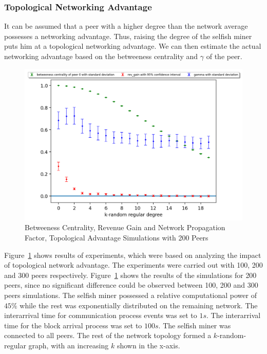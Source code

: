 \subsubsection{Topological Networking Advantage}
It can be assumed that a peer with a higher degree than the network average possesses a networking advantage. Thus, raising the degree of the selfish miner puts him at a topological networking advantage. We can then estimate the actual networking advantage based on the betweeness centrality and $\gamma$ of the peer. 
\begin{figure}[h]
		\includegraphics[width=\textwidth]{figures/full_sm_multi_degree_200rev_and_bpr_per_peer.png}
		
\caption{Betweeness Centrality, Revenue Gain and Network Propagation Factor, Topological Advantage Simulations with 200 Peers}
\label{fig:top_adv200}
\end{figure}

Figure~\ref{fig:top_adv200} shows results of experiments, which were based on analyzing the impact of topological network advantage. The experiments were carried out with 100, 200 and 300 peers respectively. Figure~\ref{fig:top_adv200} shows the results of the simulations for 200 peers, since no significant difference could be observed between 100, 200 and 300 peers simulations. The selfish miner possessed a relative computational power of $45\% $ while the rest was exponentially distributed on the remaining network. The interarrival time for communication process events was set to $1s$. The interarrival time for the block arrival process was set to $100s$. The selfish miner was connected to all peers. The rest of the network topology formed a $k$-random-regular graph, with an increasing $k$ shown in the x-axis.

